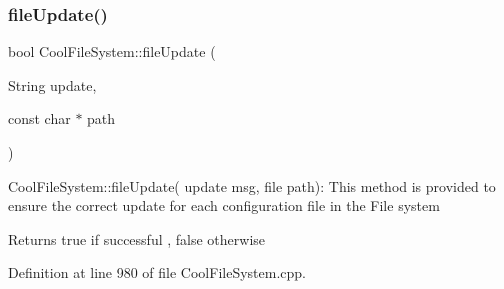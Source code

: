 \subsubsection{\texorpdfstring{file\+Update()}{fileUpdate()}}
{\footnotesize\ttfamily bool Cool\+File\+System\+::file\+Update (\begin{DoxyParamCaption}\item[{String}]{update,  }\item[{const char $\ast$}]{path }\end{DoxyParamCaption})}

Cool\+File\+System\+::file\+Update( update msg, file path)\+: This method is provided to ensure the correct update for each configuration file in the File system

\begin{DoxyReturn}{Returns}
true if successful , false otherwise 
\end{DoxyReturn}


Definition at line 980 of file Cool\+File\+System.\+cpp.


